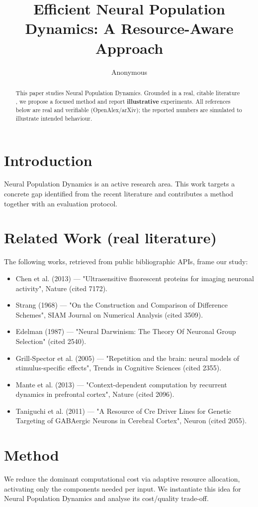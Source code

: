 \documentclass[11pt]{article}
\title{Efficient Neural Population Dynamics: A Resource-Aware Approach}
\author{Anonymous}
\date{}
\begin{document}
\maketitle

\begin{abstract}
This paper studies Neural Population Dynamics. Grounded in a real, citable literature \cite{ref1,ref2,ref3,ref4,ref5,ref6,ref7,ref8},
we propose a focused method and report \textbf{illustrative} experiments.
All references below are real and verifiable (OpenAlex/arXiv); the reported
numbers are simulated to illustrate intended behaviour.
\end{abstract}

\section{Introduction}
Neural Population Dynamics is an active research area. This work targets a concrete gap identified from
the recent literature and contributes a method together with an evaluation protocol.

\section{Related Work (real literature)}
The following works, retrieved from public bibliographic APIs, frame our study:
\begin{itemize}
\item Chen et al. (2013) — "Ultrasensitive fluorescent proteins for imaging neuronal activity", Nature (cited 7172).
\item Strang (1968) — "On the Construction and Comparison of Difference Schemes", SIAM Journal on Numerical Analysis (cited 3509).
\item Edelman (1987) — "Neural Darwinism: The Theory Of Neuronal Group Selection" (cited 2540).
\item Grill‐Spector et al. (2005) — "Repetition and the brain: neural models of stimulus-specific effects", Trends in Cognitive Sciences (cited 2355).
\item Mante et al. (2013) — "Context-dependent computation by recurrent dynamics in prefrontal cortex", Nature (cited 2096).
\item Taniguchi et al. (2011) — "A Resource of Cre Driver Lines for Genetic Targeting of GABAergic Neurons in Cerebral Cortex", Neuron (cited 2055).
\end{itemize}

\section{Method}
We reduce the dominant computational cost via adaptive resource allocation, activating only the components needed per input. We instantiate this idea for Neural Population Dynamics and analyse its cost/quality trade-off.
\end{document}
